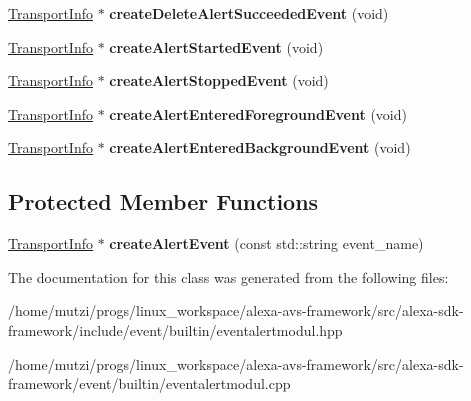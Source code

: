 \begin{DoxyCompactItemize}
\hyperlink{classAlexaEvent_1_1TransportInfo}{Transport\+Info} $\ast$ {\bfseries create\+Delete\+Alert\+Succeeded\+Event} (void)
\item 
\mbox{\label{classAlexaEvent_1_1EventAlertModul_a773f79ba34b7efe3560c9b908043caec}} 
\hyperlink{classAlexaEvent_1_1TransportInfo}{Transport\+Info} $\ast$ {\bfseries create\+Alert\+Started\+Event} (void)
\item 
\mbox{\label{classAlexaEvent_1_1EventAlertModul_a648af9e6d3452e7cd90860c7b47e2ea4}} 
\hyperlink{classAlexaEvent_1_1TransportInfo}{Transport\+Info} $\ast$ {\bfseries create\+Alert\+Stopped\+Event} (void)
\item 
\mbox{\label{classAlexaEvent_1_1EventAlertModul_ac5f76d1e0085d602b01646f0d6040389}} 
\hyperlink{classAlexaEvent_1_1TransportInfo}{Transport\+Info} $\ast$ {\bfseries create\+Alert\+Entered\+Foreground\+Event} (void)
\item 
\mbox{\label{classAlexaEvent_1_1EventAlertModul_a33f33fbd55e2a9d9f463a47e4534b35e}} 
\hyperlink{classAlexaEvent_1_1TransportInfo}{Transport\+Info} $\ast$ {\bfseries create\+Alert\+Entered\+Background\+Event} (void)
\end{DoxyCompactItemize}
\subsection*{Protected Member Functions}
\begin{DoxyCompactItemize}
\item 
\mbox{\label{classAlexaEvent_1_1EventAlertModul_acce0b5e97557df10fd5c3f621d573c13}} 
\hyperlink{classAlexaEvent_1_1TransportInfo}{Transport\+Info} $\ast$ {\bfseries create\+Alert\+Event} (const std\+::string event\+\_\+name)
\end{DoxyCompactItemize}


The documentation for this class was generated from the following files\+:\begin{DoxyCompactItemize}
\item 
/home/mutzi/progs/linux\+\_\+workspace/alexa-\/avs-\/framework/src/alexa-\/sdk-\/framework/include/event/builtin/eventalertmodul.\+hpp\item 
/home/mutzi/progs/linux\+\_\+workspace/alexa-\/avs-\/framework/src/alexa-\/sdk-\/framework/event/builtin/eventalertmodul.\+cpp\end{DoxyCompactItemize}

